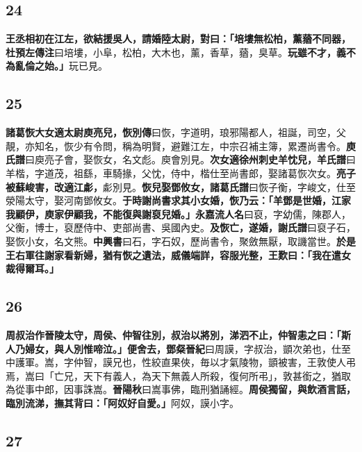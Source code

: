 \subsection*{24}

\textbf{王丞相初在江左，欲結援吳人，請婚陸太尉，對曰：「培塿無松柏，薰蕕不同器，}{\footnotesize \textbf{杜預左傳注}曰培塿，小阜，松柏，大木也，薰，香草，蕕，臭草。}\textbf{玩雖不才，義不為亂倫之始。」}{\footnotesize 玩已見。}

\subsection*{25}

\textbf{諸葛恢大女適太尉庾亮兒，}{\footnotesize \textbf{恢別傳}曰恢，字道明，琅邪陽都人，祖誕，司空，父靚，亦知名，恢少有令問，稱為明賢，避難江左，中宗召補主簿，累遷尚書令。\textbf{庾氏譜}曰庾亮子會，娶恢女，名文彪。庾會別見。}\textbf{次女適徐州刺史羊忱兒，}{\footnotesize \textbf{羊氏譜}曰羊楷，字道茂，祖繇，車騎掾，父忱，侍中，楷仕至尚書郎，娶諸葛恢次女。}\textbf{亮子被蘇峻害，改適江虨，}{\footnotesize 虨別見。}\textbf{恢兒娶鄧攸女，}{\footnotesize \textbf{諸葛氏譜}曰恢子衡，字峻文，仕至滎陽太守，娶河南鄧攸女。}\textbf{于時謝尚書求其小女婚，恢乃云：「羊鄧是世婚，江家我顧伊，庾家伊顧我，不能復與謝裒兒婚。」}{\footnotesize \textbf{永嘉流人名}曰裒，字幼儒，陳郡人，父衡，博士，裒歷侍中、吏部尚書、吳國內史。}\textbf{及恢亡，遂婚，}{\footnotesize \textbf{謝氏譜}曰裒子石，娶恢小女，名文熊。\textbf{中興書}曰石，字石奴，歷尚書令，聚斂無厭，取譏當世。}\textbf{於是王右軍往謝家看新婦，猶有恢之遺法，威儀端詳，容服光整，王歎曰：「我在遣女裁得爾耳。」}

\subsection*{26}

\textbf{周叔治作晉陵太守，周侯、仲智往別，叔治以將別，涕泗不止，仲智恚之曰：「斯人乃婦女，與人別惟啼泣。」便舍去，}{\footnotesize \textbf{鄧粲晉紀}曰周謨，字叔治，顗次弟也，仕至中護軍。嵩，字仲智，謨兄也，性絞直果俠，毎以才氣陵物，顗被害，王敦使人弔焉，嵩曰「亡兄，天下有義人，為天下無義人所殺，復何所弔」，敦甚銜之，猶取為從事中郎，因事誅嵩。\textbf{晉陽秋}曰嵩事佛，臨刑猶誦經。}\textbf{周侯獨留，與飲酒言話，臨別流涕，撫其背曰：「阿奴好自愛。」}{\footnotesize 阿奴，謨小字。}

\subsection*{27}

